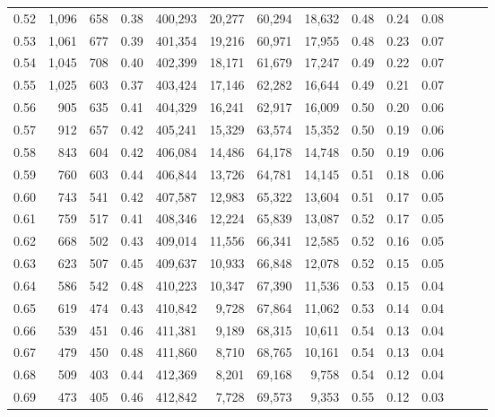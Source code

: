 \begin{tabular}{rrrrrrrrrrrrrr}
0.52 &   1,096 &    658 &  0.38 &  400,293 &   20,277 &  60,294 &  18,632 &  0.48 &  0.24 &      0.08 \\
0.53 &   1,061 &    677 &  0.39 &  401,354 &   19,216 &  60,971 &  17,955 &  0.48 &  0.23 &      0.07 \\
0.54 &   1,045 &    708 &  0.40 &  402,399 &   18,171 &  61,679 &  17,247 &  0.49 &  0.22 &      0.07 \\
0.55 &   1,025 &    603 &  0.37 &  403,424 &   17,146 &  62,282 &  16,644 &  0.49 &  0.21 &      0.07 \\
0.56 &     905 &    635 &  0.41 &  404,329 &   16,241 &  62,917 &  16,009 &  0.50 &  0.20 &      0.06 \\
0.57 &     912 &    657 &  0.42 &  405,241 &   15,329 &  63,574 &  15,352 &  0.50 &  0.19 &      0.06 \\
0.58 &     843 &    604 &  0.42 &  406,084 &   14,486 &  64,178 &  14,748 &  0.50 &  0.19 &      0.06 \\
0.59 &     760 &    603 &  0.44 &  406,844 &   13,726 &  64,781 &  14,145 &  0.51 &  0.18 &      0.06 \\
0.60 &     743 &    541 &  0.42 &  407,587 &   12,983 &  65,322 &  13,604 &  0.51 &  0.17 &      0.05 \\
0.61 &     759 &    517 &  0.41 &  408,346 &   12,224 &  65,839 &  13,087 &  0.52 &  0.17 &      0.05 \\
0.62 &     668 &    502 &  0.43 &  409,014 &   11,556 &  66,341 &  12,585 &  0.52 &  0.16 &      0.05 \\
0.63 &     623 &    507 &  0.45 &  409,637 &   10,933 &  66,848 &  12,078 &  0.52 &  0.15 &      0.05 \\
0.64 &     586 &    542 &  0.48 &  410,223 &   10,347 &  67,390 &  11,536 &  0.53 &  0.15 &      0.04 \\
0.65 &     619 &    474 &  0.43 &  410,842 &    9,728 &  67,864 &  11,062 &  0.53 &  0.14 &      0.04 \\
0.66 &     539 &    451 &  0.46 &  411,381 &    9,189 &  68,315 &  10,611 &  0.54 &  0.13 &      0.04 \\
0.67 &     479 &    450 &  0.48 &  411,860 &    8,710 &  68,765 &  10,161 &  0.54 &  0.13 &      0.04 \\
0.68 &     509 &    403 &  0.44 &  412,369 &    8,201 &  69,168 &   9,758 &  0.54 &  0.12 &      0.04 \\
0.69 &     473 &    405 &  0.46 &  412,842 &    7,728 &  69,573 &   9,353 &  0.55 &  0.12 &      0.03 \\

\end{tabular}
